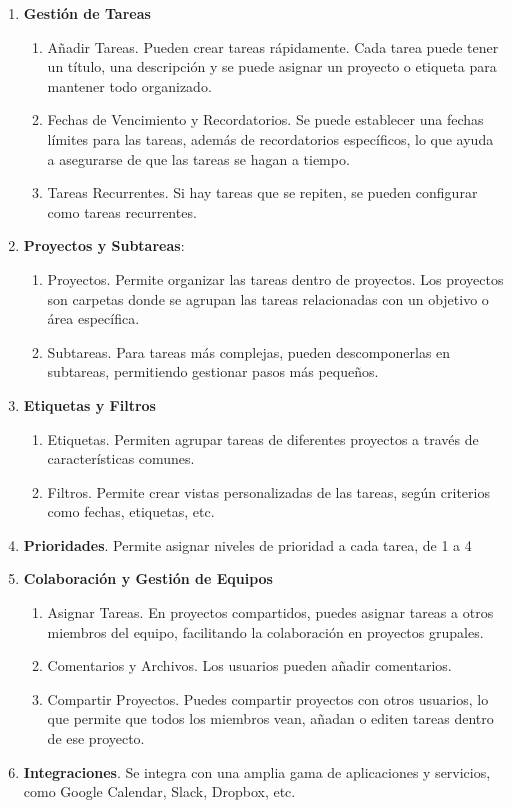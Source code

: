 \begin{enumerate}
    \item \textbf{Gestión de Tareas}
    \begin{enumerate}
        \item Añadir Tareas. Pueden crear tareas rápidamente. Cada tarea puede tener un título, una descripción y se puede asignar un proyecto o etiqueta para mantener todo organizado.
        \item Fechas de Vencimiento y Recordatorios. Se puede establecer una fechas límites para las tareas, además de recordatorios específicos, lo que ayuda a asegurarse de que las tareas se hagan a tiempo.
        \item Tareas Recurrentes. Si hay tareas que se repiten, se pueden configurar como tareas recurrentes. 
    \end{enumerate}
    \item \textbf{Proyectos y Subtareas}: 
    \begin{enumerate}
        \item Proyectos. Permite organizar las tareas dentro de proyectos. Los proyectos son carpetas donde se agrupan las tareas relacionadas con un objetivo o área específica.
        \item Subtareas. Para tareas más complejas, pueden descomponerlas en subtareas, permitiendo gestionar pasos más pequeños. 
    \end{enumerate}
    \item \textbf{Etiquetas y Filtros}
    \begin{enumerate}
        \item Etiquetas. Permiten agrupar tareas de diferentes proyectos a través de características comunes.
        \item Filtros. Permite crear vistas personalizadas de las tareas, según criterios como fechas, etiquetas, etc.
    \end{enumerate}
    \item \textbf{Prioridades}. Permite asignar niveles de prioridad a cada tarea, de 1 a 4
    \item \textbf {Colaboración y Gestión de Equipos}
    \begin{enumerate}
        \item Asignar Tareas. En proyectos compartidos, puedes asignar tareas a otros miembros del equipo, facilitando la colaboración en proyectos grupales. 
        \item Comentarios y Archivos. Los usuarios pueden añadir comentarios.
        \item Compartir Proyectos. Puedes compartir proyectos con otros usuarios, lo que permite que todos los miembros vean, añadan o editen tareas dentro de ese proyecto.
    \end{enumerate}
    \item \textbf{Integraciones}. Se integra con una amplia gama de aplicaciones y servicios, como Google Calendar, Slack, Dropbox, etc.
\end{enumerate}


